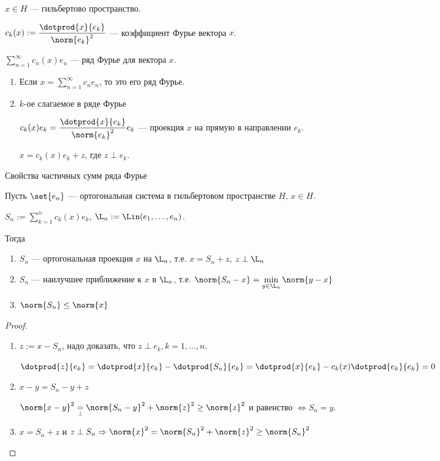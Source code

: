 \begin{definition}
    $x \in H$ --- гильбертово пространство.

    $c_k(x) := \dfrac{\dotprod{x}{e_k}}{\norm{e_k}^2}$ --- коэффициент Фурье вектора $x$.

    $\sum\limits_{n=1}^\infty c_n(x) e_n$ --- ряд Фурье для вектора $x$.
\end{definition}

\begin{observation}
    \begin{enumerate}
        \item Если $x = \sum\limits_{n=1}^\infty c_n e_n$, то это его ряд Фурье.
        \item $k$-ое слагаемое в ряде Фурье

              $c_k(x) e_k = \dfrac{\dotprod{x}{e_k}}{\norm{e_k}^2} e_k$ --- проекция $x$ на прямую в направлении $e_k$.

              $x = c_k(x)e_k + z$, где $z \perp e_k$.
    \end{enumerate}
\end{observation}

\begin{theorem}{Свойства частичных сумм ряда Фурье}

    Пусть $\set{e_n}$ --- ортогональная система в гильбертовом пространстве $H$, $x \in H$.

    $S_n := \sum\limits_{k=1}^n c_k(x) e_k$,
    $\L_n := \Lin(e_1, \ldots, e_n)$.

    Тогда
    \begin{enumerate}
        \item $S_n$ --- ортогональная проекция $x$ на $\L_n$, т.е. $x = S_n + z$, $z \perp \L_n$
        \item $S_n$ --- наилучшее приближение к $x$ в $\L_n$, т.е. $\norm{S_n - x} = \min\limits_{y \in \L_n} \norm{y-x}$
        \item $\norm{S_n} \leq \norm{x}$
    \end{enumerate}
\end{theorem}
\begin{proof}
    \begin{enumerate}
        \item $z := x - S_n$, надо доказать, что $z \perp e_k, k = 1,\ldots, n$.

              $\dotprod{z}{e_k} = \dotprod{x}{e_k} - \dotprod{S_n}{e_k} = \dotprod{x}{e_k} - c_k(x)\dotprod{e_k}{e_k} = 0$
        \item $x-y = S_n - y + z$

              $\norm{x - y}^2 \underset{\perp}{=} \norm{S_n - y}^2 + \norm{z}^2 \geq \norm{z}^2$
              и равенство $\iff S_n = y$.
        \item $x = S_n + z$ и $z \perp S_n \Rightarrow \norm{x}^2 = \norm{S_n}^2 + \norm{z}^2 \geq \norm{S_n}^2$
    \end{enumerate}
\end{proof}

